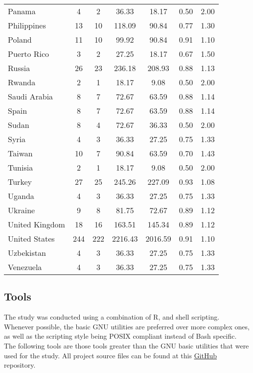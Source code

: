 \documentclass{article}
\theoremstyle{definition}
\begin{document}
\begin{table}[H]
\begin{tabular}{l|cccccc}
Panama &   4 &   2 & 36.33 & 18.17 & 0.50 & 2.00 \\
Philippines &  13 &  10 & 118.09 & 90.84 & 0.77 & 1.30 \\
Poland &  11 &  10 & 99.92 & 90.84 & 0.91 & 1.10 \\
Puerto Rico &   3 &   2 & 27.25 & 18.17 & 0.67 & 1.50 \\
Russia &  26 &  23 & 236.18 & 208.93 & 0.88 & 1.13 \\
Rwanda &   2 &   1 & 18.17 & 9.08 & 0.50 & 2.00 \\
Saudi Arabia &   8 &   7 & 72.67 & 63.59 & 0.88 & 1.14 \\
Spain &   8 &   7 & 72.67 & 63.59 & 0.88 & 1.14 \\
Sudan &   8 &   4 & 72.67 & 36.33 & 0.50 & 2.00 \\
Syria &   4 &   3 & 36.33 & 27.25 & 0.75 & 1.33 \\
Taiwan &  10 &   7 & 90.84 & 63.59 & 0.70 & 1.43 \\
Tunisia &   2 &   1 & 18.17 & 9.08 & 0.50 & 2.00 \\
Turkey &  27 &  25 & 245.26 & 227.09 & 0.93 & 1.08 \\
Uganda &   4 &   3 & 36.33 & 27.25 & 0.75 & 1.33 \\
Ukraine &   9 &   8 & 81.75 & 72.67 & 0.89 & 1.12 \\
United Kingdom &  18 &  16 & 163.51 & 145.34 & 0.89 & 1.12 \\
United States & 244 & 222 & 2216.43 & 2016.59 & 0.91 & 1.10 \\
Uzbekistan &   4 &   3 & 36.33 & 27.25 & 0.75 & 1.33 \\
Venezuela &   4 &   3 & 36.33 & 27.25 & 0.75 & 1.33 \\
\end{tabular}
\end{table}

\subsection{Tools} \label{sec:tools}
The study was conducted using a combination of R, and shell scripting.
Whenever possible, the basic GNU utilities are preferred over more complex
ones, as well as the scripting style being POSIX compliant instead of Bash
specific. The following tools are those tools greater than the GNU basic utilities
that were used for the study.
All project source files can be found at this
\href{https://github.com/chrissobczak/os-survey}{GitHub} repository.
\end{document}
